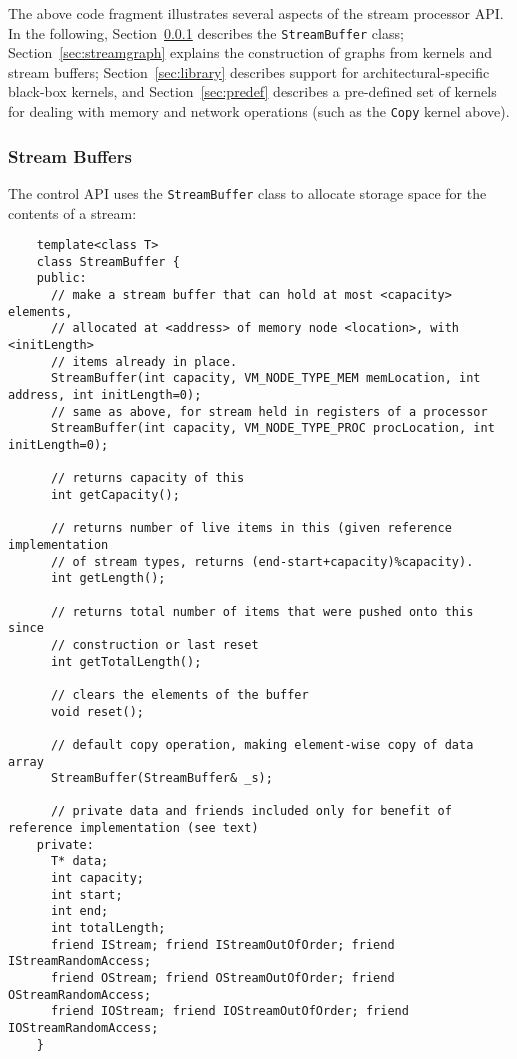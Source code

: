The above code fragment illustrates several aspects of the stream
processor API.  In the following, Section~\ref{sec:procstreams}
describes the {\tt StreamBuffer} class; Section~\ref{sec:streamgraph}
explains the construction of graphs from kernels and stream buffers;
Section~\ref{sec:library} describes support for architectural-specific
black-box kernels, and Section~\ref{sec:predef} describes a
pre-defined set of kernels for dealing with memory and network
operations (such as the {\tt Copy} kernel above).

\subsubsection{Stream Buffers}
\label{sec:procstreams}

The control API uses the {\tt StreamBuffer} class to allocate storage
space for the contents of a stream:
{\small
\begin{verbatim}
    template<class T>
    class StreamBuffer {
    public:
      // make a stream buffer that can hold at most <capacity> elements,
      // allocated at <address> of memory node <location>, with <initLength>
      // items already in place.
      StreamBuffer(int capacity, VM_NODE_TYPE_MEM memLocation, int address, int initLength=0);
      // same as above, for stream held in registers of a processor
      StreamBuffer(int capacity, VM_NODE_TYPE_PROC procLocation, int initLength=0);

      // returns capacity of this
      int getCapacity();

      // returns number of live items in this (given reference implementation
      // of stream types, returns (end-start+capacity)%capacity).
      int getLength();

      // returns total number of items that were pushed onto this since
      // construction or last reset
      int getTotalLength();

      // clears the elements of the buffer
      void reset();

      // default copy operation, making element-wise copy of data array
      StreamBuffer(StreamBuffer& _s);

      // private data and friends included only for benefit of reference implementation (see text)
    private:
      T* data;
      int capacity;
      int start;
      int end;
      int totalLength;
      friend IStream; friend IStreamOutOfOrder; friend IStreamRandomAccess;
      friend OStream; friend OStreamOutOfOrder; friend OStreamRandomAccess;
      friend IOStream; friend IOStreamOutOfOrder; friend IOStreamRandomAccess;
    }
\end{verbatim}}


